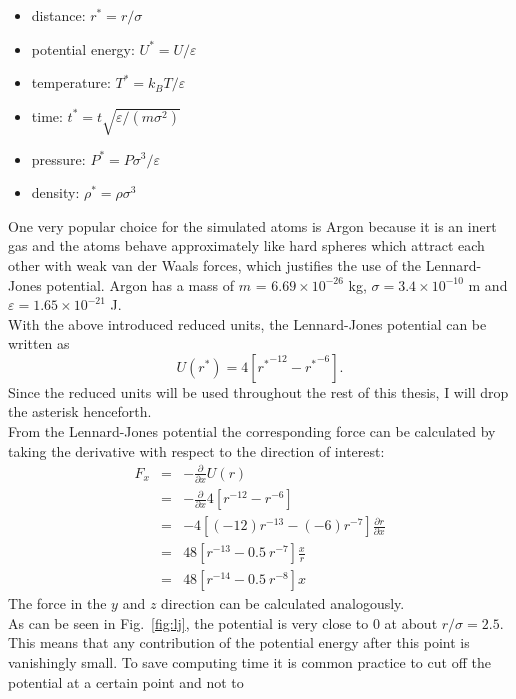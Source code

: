 \documentclass[12pt]{article}
\begin{document}
\begin{itemize}
    \item {distance:} $r^* = r/\sigma$
    \item {potential energy:} $U^* = U/\varepsilon$
    \item {temperature:} $T^* = k_B T/\varepsilon$
    \item {time:} $t^* = t\sqrt{\varepsilon/(m\sigma^2)}$
    \item {pressure:} $P^* = P\sigma^3/\varepsilon$
    \item {density:} $\rho^* = \rho \sigma^3$
\end{itemize}
One very popular choice for the simulated atoms is Argon because it is an inert gas and the atoms behave 
approximately like hard spheres which attract each other with weak van der Waals forces, which justifies the use of the Lennard-Jones potential. 
Argon has a mass of $m$ = $6.69 \times 10^{-26}$ kg, $\sigma = 3.4 \times 10^{-10}$ m and $\varepsilon = 1.65 \times 10^{-21}$ J.\\
With the above introduced reduced units, the Lennard-Jones potential can be written as
\begin{equation}
    U(r^*) = 4\left[{r^*}^{-12} - {r^*}^{-6}\right].
\end{equation}
Since the reduced units will be used throughout the rest of this thesis, I will drop the asterisk henceforth.\\
From the Lennard-Jones potential the corresponding force can be calculated by taking the derivative with respect to the direction of interest:
\begin{eqnarray}
    F_{x} &=& -\frac{\partial}{\partial x} U(r) \nonumber\\
                &=& -\frac{\partial}{\partial x} 4\left[{r}^{-12} - {r}^{-6}\right] \nonumber\\
                &=& -4 \left[(-12){r}^{-13} - (-6){r}^{-7}\right] \frac{\partial r}{\partial x} \nonumber\\
                &=& 48 \left[r^{-13} - 0.5 \ r^{-7}\right] \frac{x}{r} \nonumber\\
    \label{eq:ljforce} &=& 48 \left[r^{-14} - 0.5 \ r^{-8}\right] x
\end{eqnarray}
The force in the $y$ and $z$ direction can be calculated analogously.\\
As can be seen in Fig.~\ref{fig:lj}, the potential is very close to 0 at about $r/\sigma=2.5$. This means that any contribution of the potential
energy after this point is vanishingly small. To save computing time it is common practice to cut off the potential at a certain point and not to
\end{document}
